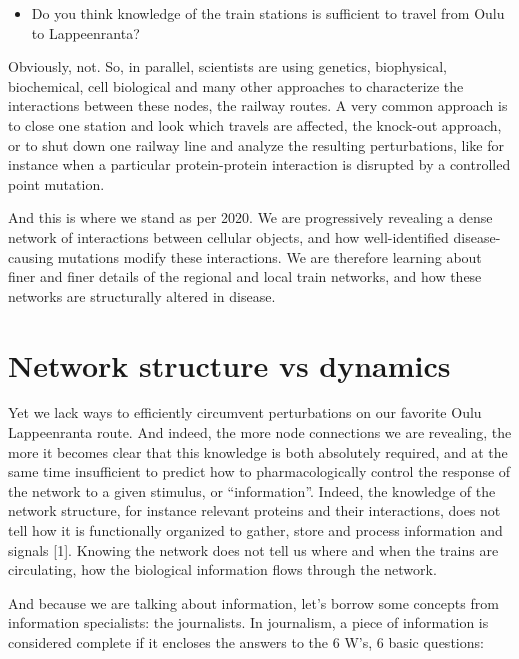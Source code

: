\documentclass[
]{book}
\providecommand{\tightlist}{%
  \setlength{\itemsep}{0pt}\setlength{\parskip}{0pt}}
\begin{document}
\begin{itemize}
\tightlist
\item
  Do you think knowledge of the train stations is sufficient to travel from Oulu to Lappeenranta?
\end{itemize}

Obviously, not. So, in parallel, scientists are using genetics, biophysical, biochemical, cell biological and many other approaches to characterize the interactions between these nodes, the railway routes. A very common approach is to close one station and look which travels are affected, the knock-out approach, or to shut down one railway line and analyze the resulting perturbations, like for instance when a particular protein-protein interaction is disrupted by a controlled point mutation.

And this is where we stand as per 2020. We are progressively revealing a dense network of interactions between cellular objects, and how well-identified disease-causing mutations modify these interactions. We are therefore learning about finer and finer details of the regional and local train networks, and how these networks are structurally altered in disease.

\hypertarget{network-structure-vs-dynamics}{%
\section{Network structure vs dynamics}\label{network-structure-vs-dynamics}}

Yet we lack ways to efficiently circumvent perturbations on our favorite Oulu Lappeenranta route. And indeed, the more node connections we are revealing, the more it becomes clear that this knowledge is both absolutely required, and at the same time insufficient to predict how to pharmacologically control the response of the network to a given stimulus, or ``information''. Indeed, the knowledge of the network structure, for instance relevant proteins and their interactions, does not tell how it is functionally organized to gather, store and process information and signals {[}1{]}. Knowing the network does not tell us where and when the trains are circulating, how the biological information flows through the network.

And because we are talking about information, let's borrow some concepts from information specialists: the journalists. In journalism, a piece of information is considered complete if it encloses the answers to the 6 W's, 6 basic questions:
\end{document}
